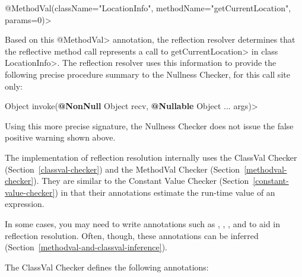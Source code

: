\quad \<@MethodVal(className="LocationInfo", methodName="getCurrentLocation", params=0)>

Based on this \<@MethodVal> annotation, the reflection resolver determines that
the reflective method call represents a call to \<getCurrentLocation> in class
\<LocationInfo>.
The reflection resolver uses this information to provide the
following precise procedure summary to the Nullness Checker, for this
call site only:

\quad {} Object invoke({\bfseries @NonNull} Object recv, {\bfseries @Nullable} Object ... args)>

Using this more precise signature, the Nullness Checker does not issue the false positive warning shown above.



The implementation of reflection resolution internally uses the ClassVal
Checker (Section~\ref{classval-checker}) and the MethodVal Checker
(Section~\ref{methodval-checker}).  They are similar to the Constant
Value Checker (Section~\ref{constant-value-checker}) in that their
annotations estimate the run-time value of an expression.

In some cases, you may need to write annotations such as
,
,
, and
 to aid in reflection
resolution.
Often, though, these annotations can be inferred
(Section~\ref{methodval-and-classval-inference}).



The ClassVal Checker defines the following annotations:

